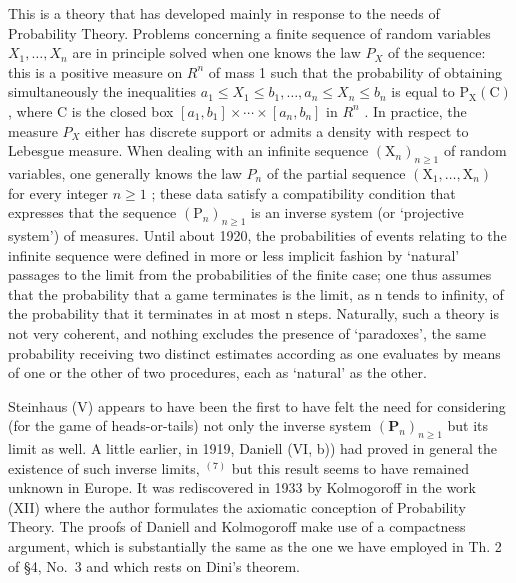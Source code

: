 This is a theory that has developed mainly in response to the needs of Probability Theory. Problems concerning a finite sequence of random variables \(X_{1},\ldots,X_{n}\) are in principle solved when one knows the law \(P_{X}\) of the sequence: this is a positive measure on \(R^{n}\) of mass 1 such that the probability of obtaining simultaneously the inequalities \(a_{1}\leqslant X_{1}\leqslant b_{1},\ldots,a_{n}\leqslant X_{n}\leqslant b_{n}\) is equal to \(\mathrm{P}_{\mathrm{X}}(\mathrm{C})\) , where C is the closed box \([a_{1},b_{1}]\times\cdots\times[a_{n},b_{n}]\) in \(R^{n}\) . In practice, the measure \(P_{X}\) either has discrete support or admits a density with respect to Lebesgue measure. When dealing with an infinite sequence \((\mathrm{X}_{n})_{n\geqslant1}\) of random variables, one generally knows the law \(P_{n}\) of the partial sequence \((\mathrm{X}_{1},\ldots,\mathrm{X}_{n})\) for every integer \(n\geqslant1\) ; these data satisfy a compatibility condition that expresses that the sequence \((\mathrm{P}_{n})_{n\geqslant1}\) is an inverse system (or `projective system') of measures. Until about 1920, the probabilities of events relating to the infinite sequence were defined in more or less implicit fashion by `natural' passages to the limit from the probabilities of the finite case; one thus assumes that the probability that a game terminates is the limit, as n tends to infinity, of the probability that it terminates in at most n steps. Naturally, such a theory is not very coherent, and nothing excludes the presence of `paradoxes', the same probability receiving two distinct estimates according as one evaluates by means of one or the other of two procedures, each as `natural' as the other.

Steinhaus (V) appears to have been the first to have felt the need for considering (for the game of heads-or-tails) not only the inverse system \((\mathbf{P}_{n})_{n\geqslant1}\) but its limit as well. A little earlier, in 1919, Daniell (VI, b)) had proved in general the existence of such inverse limits, \(^{(7)}\) but this result seems to have remained unknown in Europe. It was rediscovered in 1933 by Kolmogoroff in the work (XII) where the author formulates the axiomatic conception of Probability Theory. The proofs of Daniell and Kolmogoroff make use of a compactness argument, which is substantially the same as the one we have employed in Th. 2 of §4, No.~3 and which rests on Dini's theorem.

